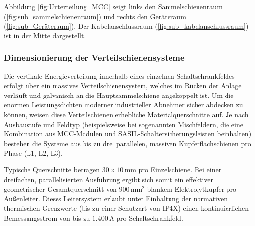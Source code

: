 \noindent
Abbildung \ref{fig:Unterteilung_MCC} zeigt links den Sammelschienenraum (\ref{fig:sub_sammelschienenraum}) und rechts den Geräteraum (\ref{fig:sub_Geräteraum}). Der Kabelanschlussraum (\ref{fig:sub_kabelanschlussraum}) ist in der Mitte dargestellt.
\subsubsection{Dimensionierung der Verteilschienensysteme}
Die vertikale Energieverteilung innerhalb eines einzelnen Schaltschrankfeldes erfolgt über ein massives Verteilschienensystem, welches im Rücken der Anlage verläuft und galvanisch an die Hauptsammelschiene angekoppelt ist. Um die enormen Leistungsdichten moderner industrieller Abnehmer sicher abdecken zu können, weisen diese Verteilschienen erhebliche Materialquerschnitte auf. Je nach Ausbaustufe und Feldtyp (beispielsweise bei sogenannten Mischfeldern, die eine Kombination aus MCC-Modulen und SASIL-Schaltersicherungsleisten beinhalten) bestehen die Systeme aus bis zu drei parallelen, massiven Kupferflachschienen pro Phase (L1, L2, L3).

Typische Querschnitte betragen $30 \times 10\,\text{mm}$ pro Einzelschiene. Bei einer dreifachen, parallelisierten Ausführung ergibt sich somit ein effektiver geometrischer Gesamtquerschnitt von $900\,\text{mm}^2$ blankem Elektrolytkupfer pro Außenleiter. Dieses Leitersystem erlaubt unter Einhaltung der normativen thermischen Grenzwerte (bis zu einer Schutzart von IP4X) einen kontinuierlichen Bemessungsstrom von bis zu $1.400\,\text{A}$ pro Schaltschrankfeld.

